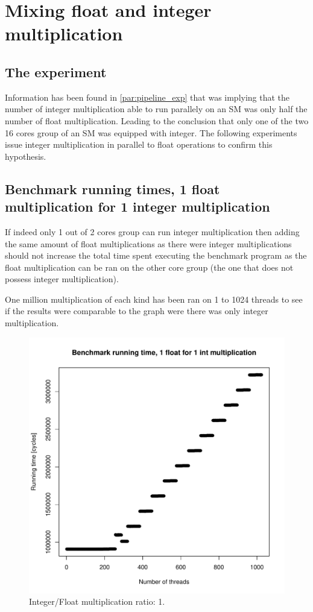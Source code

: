 \documentclass{report}
\def \scalingfactor{.8}
\begin{document}
\section{Mixing float and integer multiplication}
	\subsection{The experiment}
	Information has been found in \ref{par:pipeline_exp} that was implying that the number of 
    integer multiplication able to run parallely on an SM was only half the number of 
    float multiplication. Leading to the conclusion that only one of
    the two 16 cores group of an SM was equipped with integer. The following experiments issue 
    integer multiplication in parallel to float operations to confirm this hypothesis.
	\subsection{Benchmark running times, 1 float multiplication for 1 integer multiplication}
	If indeed only 1 out of 2 cores group can run integer multiplication then
    adding the same amount of float multiplications as there were integer
    multiplications should not increase the total time spent executing the benchmark 
    program as the float multiplication can
    be ran on the other core group (the one that does not possess integer multiplication).
	
	One million multiplication of each kind has been ran on 1 to 1024 threads to
    see if the results were comparable to the graph were there was only integer multiplication.
	\begin{figure}[H]
		\centering
    			\includegraphics[width=\scalingfactor\linewidth]{"graphics/running_times_ratio11"}
		\vspace{-15pt}
		\captionsetup{justification=centering}
		\caption{Integer/Float multiplication ratio: 1.}
	\end{figure}
	\pagebreak
\end{document}
